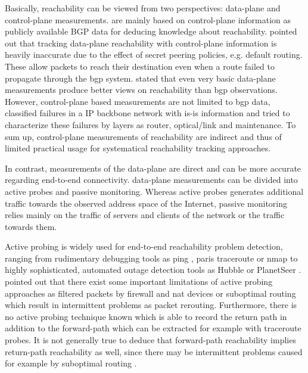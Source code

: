Basically, reachability can be viewed from two perspectives: \gls{data-plane} 
and \gls{control-plane} measurements. 
\citep{Feamster:2005,Zhang:2010,Mahajan:2002,Chen:2001} are mainly 
based on \gls{control-plane} information as publicly available BGP data for 
deducing knowledge about reachability. \citet{Bush:Optometry} pointed out that 
tracking \gls{data-plane} reachability with \gls{control-plane} information is 
heavily inaccurate due to the effect of secret peering policies, e.g. default 
routing. These allow packets to reach their destination even when a route failed 
to propagate through the \gls{bgp} system.
\citet{Bush:Optometry} stated that even very basic \gls{data-plane} measurements
produce better views on reachability than \gls{bgp} observations. However,
\gls{control-plane} based measurements are not limited to \gls{bgp} data,
\citet{Markopoulou:2008} classified failures in a IP backbone network with 
\gls{is-is} information and tried to characterize these failures by layers as 
router, optical/link and maintenance. To sum up, \gls{control-plane} 
measurements of reachability are indirect and thus of limited practical usage 
for systematical reachability tracking approaches.

In contrast, measurements of the \gls{data-plane} are direct and can be more 
accurate regarding end-to-end connectivity. \Gls{data-plane} measurements can be 
divided into active probes and passive monitoring. Whereas active probes 
generates additional traffic towards the observed address space of the Internet, 
passive monitoring relies mainly on the traffic of servers and clients 
of the network or the traffic towards them. 

Active probing is widely used for end-to-end reachability problem detection,
ranging from rudimentary debugging tools as ping \citep{PING}, paris traceroute
\citep{traceroute} or nmap \citep{Nmap} to highly sophisticated, automated
outage detection tools as Hubble \citep{Katz:2008} or PlanetSeer
\citep{Zhang:2004}. \citet{Bush:Optometry} pointed out that there exist some
important limitations of active probing approaches as filtered packets by 
firewall and \gls{nat} devices or suboptimal routing which result in 
intermittent problems as packet rerouting.
Furthermore, there is no active probing technique known which is able to record
the return path in addition to the forward-path which can be extracted for
example with traceroute probes. It is not generally true to deduce that
forward-path reachability implies return-path reachability as well, since there
may be intermittent problems caused for example by suboptimal routing
\citep{Bush:Optometry}.

